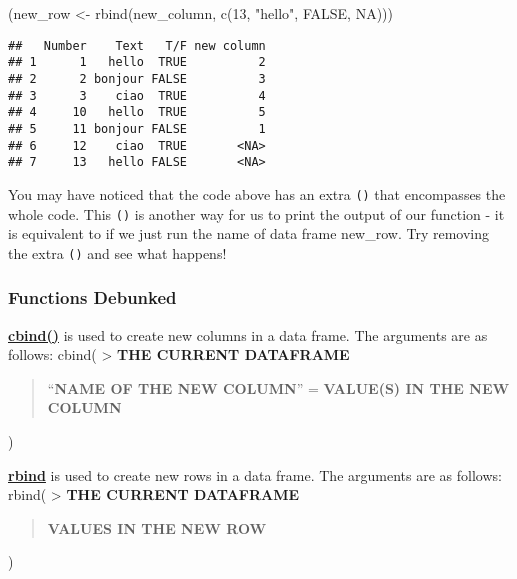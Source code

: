 \documentclass[
]{book}
\newenvironment{Shaded}{\begin{snugshade}}{\end{snugshade}}
\newcommand{\ConstantTok}[1]{\textcolor[rgb]{0.00,0.00,0.00}{#1}}
\newcommand{\DecValTok}[1]{\textcolor[rgb]{0.00,0.00,0.81}{#1}}
\newcommand{\FunctionTok}[1]{\textcolor[rgb]{0.00,0.00,0.00}{#1}}
\newcommand{\NormalTok}[1]{#1}
\newcommand{\OtherTok}[1]{\textcolor[rgb]{0.56,0.35,0.01}{#1}}
\newcommand{\StringTok}[1]{\textcolor[rgb]{0.31,0.60,0.02}{#1}}
\begin{document}
\begin{Shaded}
\begin{Highlighting}[]
\NormalTok{(new\_row }\OtherTok{\textless{}{-}} \FunctionTok{rbind}\NormalTok{(new\_column, }\FunctionTok{c}\NormalTok{(}\DecValTok{13}\NormalTok{, }\StringTok{"hello"}\NormalTok{, }\ConstantTok{FALSE}\NormalTok{, }\ConstantTok{NA}\NormalTok{)))}
\end{Highlighting}
\end{Shaded}

\begin{verbatim}
##   Number    Text   T/F new column
## 1      1   hello  TRUE          2
## 2      2 bonjour FALSE          3
## 3      3    ciao  TRUE          4
## 4     10   hello  TRUE          5
## 5     11 bonjour FALSE          1
## 6     12    ciao  TRUE       <NA>
## 7     13   hello FALSE       <NA>
\end{verbatim}

You may have noticed that the code above has an extra \texttt{()} that encompasses the whole code. This \texttt{()} is another way for us to print the output of our function - it is equivalent to if we just run the name of data frame new\_row. Try removing the extra \texttt{()} and see what happens!

\hypertarget{functions-debunked-4}{%
\subsubsection{Functions Debunked}\label{functions-debunked-4}}

\textbf{\href{https://www.rdocumentation.org/packages/base/versions/3.6.2/topics/cbind}{cbind()}} is used to create new columns in a data frame. The arguments are as follows:
cbind(
\textgreater{} \textbf{THE CURRENT DATAFRAME}

\begin{quote}
``\textbf{NAME OF THE NEW COLUMN}'' = \textbf{VALUE(S) IN THE NEW COLUMN}
\end{quote}

)

\textbf{\href{https://www.rdocumentation.org/packages/SparkR/versions/2.4.6/topics/rbind}{rbind}} is used to create new rows in a data frame. The arguments are as follows:
rbind(
\textgreater{} \textbf{THE CURRENT DATAFRAME}

\begin{quote}
\textbf{VALUES IN THE NEW ROW}
\end{quote}

)
\end{document}
